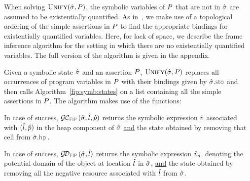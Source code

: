 When solving $\textsc{Unify}(\hat{\sigma}, P)$, the symbolic variables of $P$ that are not 
in $\hat{\sigma}$ are assumed to be existentially quantified. 
As in~\cite{nguyen:vmcai:2008}, we make 
use of a topological ordering of the simple assertions in $P$ to find the appropriate bindings 
for existentially quantified variables. Here, for lack of space, we describe the frame inference 
algorithm for the setting in which there are no existentially quantified variables. 
The full version of the algorithm is given in the appendix.  

Given a symbolic state $\hat{\sigma}$ and an assertion $P$, $\textsc{Unify}(\hat{\sigma}, P)$ 
 replaces all occurrences of program variables in $P$ with their bindings 
given by $\sstate.\stosel$ and then calls Algorithm~\ref{fip:symb:states} 
on a list containing all the simple assertions in $P$. The algorithm makes use of the
functions: 

\begin{description}
\setlength{\itemsep}{0.2em}
  \item[FIP GetCell.] In case of success, $\GetCellV{\sstate, \sloc, \sexprp}$ returns 
          the symbolic expression $\hat{v}$ associated with 
          $(\hat{l}, \hat{p})$ in the heap component of $\hat{\sigma}$ \underline{and} 
          the state obtained by removing that cell from $\sstate.\hpsel$.
  
  \item[FIP GetDomain.] In case of success, $\GetDomainV{\sstate, \sloc}$ returns 
          the symbolic expression $\hat{v}_d$, denoting the potential domain 
          of the object at location $\hat{l}$ in $\hat{\sigma}$, \underline{and} 
          the state obtained by removing all the negative resource associated with 
          $\hat{l}$ from $\hat{\sigma}$.  
%  
\end{description}


